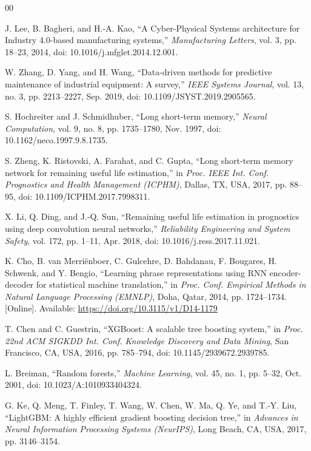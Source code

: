 \documentclass[conference]{IEEEtran}
\begin{document}
\begin{thebibliography}{00}

J. Lee, B. Bagheri, and H.-A. Kao, ``A Cyber-Physical Systems architecture for Industry 4.0-based manufacturing systems,'' \textit{Manufacturing Letters}, vol. 3, pp. 18--23, 2014, doi: 10.1016/j.mfglet.2014.12.001.

W. Zhang, D. Yang, and H. Wang, ``Data-driven methods for predictive maintenance of industrial equipment: A survey,'' \textit{IEEE Systems Journal}, vol. 13, no. 3, pp. 2213--2227, Sep. 2019, doi: 10.1109/JSYST.2019.2905565.

S. Hochreiter and J. Schmidhuber, ``Long short-term memory,'' \textit{Neural Computation}, vol. 9, no. 8, pp. 1735--1780, Nov. 1997, doi: 10.1162/neco.1997.9.8.1735.

S. Zheng, K. Ristovski, A. Farahat, and C. Gupta, ``Long short-term memory network for remaining useful life estimation,'' in \textit{Proc. IEEE Int. Conf. Prognostics and Health Management (ICPHM)}, Dallas, TX, USA, 2017, pp. 88--95, doi: 10.1109/ICPHM.2017.7998311.

X. Li, Q. Ding, and J.-Q. Sun, ``Remaining useful life estimation in prognostics using deep convolution neural networks,'' \textit{Reliability Engineering and System Safety}, vol. 172, pp. 1--11, Apr. 2018, doi: 10.1016/j.ress.2017.11.021.

K. Cho, B. van Merri\"{e}nboer, C. Gulcehre, D. Bahdanau, F. Bougares, H. Schwenk, and Y. Bengio, ``Learning phrase representations using RNN encoder-decoder for statistical machine translation,'' in \textit{Proc. Conf. Empirical Methods in Natural Language Processing (EMNLP)}, Doha, Qatar, 2014, pp. 1724--1734. [Online]. Available: \url{https://doi.org/10.3115/v1/D14-1179}

T. Chen and C. Guestrin, ``XGBoost: A scalable tree boosting system,'' in \textit{Proc. 22nd ACM SIGKDD Int. Conf. Knowledge Discovery and Data Mining}, San Francisco, CA, USA, 2016, pp. 785--794, doi: 10.1145/2939672.2939785.

L. Breiman, ``Random forests,'' \textit{Machine Learning}, vol. 45, no. 1, pp. 5--32, Oct. 2001, doi: 10.1023/A:1010933404324.

G. Ke, Q. Meng, T. Finley, T. Wang, W. Chen, W. Ma, Q. Ye, and T.-Y. Liu, ``LightGBM: A highly efficient gradient boosting decision tree,'' in \textit{Advances in Neural Information Processing Systems (NeurIPS)}, Long Beach, CA, USA, 2017, pp. 3146--3154.


\end{thebibliography}
\end{document}
